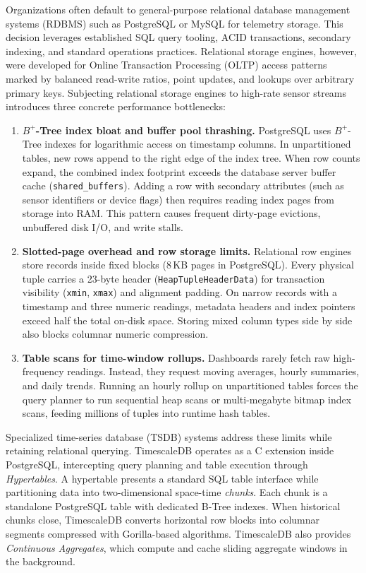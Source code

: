 \documentclass[conference,a4paper]{IEEEtran}
\newcommand{\code}[1]{\texttt{\small #1}}
\begin{document}
Organizations often default to general-purpose relational database management systems (RDBMS) such as PostgreSQL or MySQL for telemetry storage. This decision leverages established SQL query tooling, ACID transactions, secondary indexing, and standard operations practices. Relational storage engines, however, were developed for Online Transaction Processing (OLTP) access patterns marked by balanced read-write ratios, point updates, and lookups over arbitrary primary keys. Subjecting relational storage engines to high-rate sensor streams introduces three concrete performance bottlenecks:

\begin{enumerate}
    \item \textbf{$B^+$-Tree index bloat and buffer pool thrashing.} PostgreSQL uses $B^+$-Tree indexes for logarithmic access on timestamp columns. In unpartitioned tables, new rows append to the right edge of the index tree. When row counts expand, the combined index footprint exceeds the database server buffer cache (\code{shared\_buffers}). Adding a row with secondary attributes (such as sensor identifiers or device flags) then requires reading index pages from storage into RAM. This pattern causes frequent dirty-page evictions, unbuffered disk I/O, and write stalls.
    \item \textbf{Slotted-page overhead and row storage limits.} Relational row engines store records inside fixed blocks (8\,KB pages in PostgreSQL). Every physical tuple carries a 23-byte header (\code{HeapTupleHeaderData}) for transaction visibility (\code{xmin}, \code{xmax}) and alignment padding. On narrow records with a timestamp and three numeric readings, metadata headers and index pointers exceed half the total on-disk space. Storing mixed column types side by side also blocks columnar numeric compression.
    \item \textbf{Table scans for time-window rollups.} Dashboards rarely fetch raw high-frequency readings. Instead, they request moving averages, hourly summaries, and daily trends. Running an hourly rollup on unpartitioned tables forces the query planner to run sequential heap scans or multi-megabyte bitmap index scans, feeding millions of tuples into runtime hash tables.
\end{enumerate}

Specialized time-series database (TSDB) systems address these limits while retaining relational querying. TimescaleDB operates as a C extension inside PostgreSQL, intercepting query planning and table execution through \textit{Hypertables}. A hypertable presents a standard SQL table interface while partitioning data into two-dimensional space-time \textit{chunks}. Each chunk is a standalone PostgreSQL table with dedicated B-Tree indexes. When historical chunks close, TimescaleDB converts horizontal row blocks into columnar segments compressed with Gorilla-based algorithms. TimescaleDB also provides \textit{Continuous Aggregates}, which compute and cache sliding aggregate windows in the background.
\end{document}
